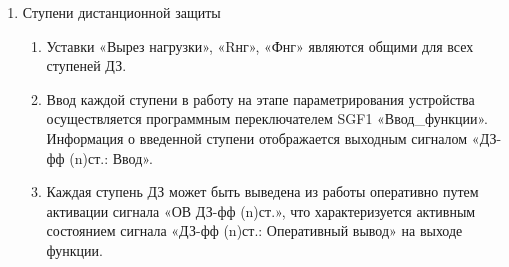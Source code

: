 \begin{enumerate}
\begin{enumerate}
\item
Пусковые  условия  функции  сформируются  только  в  том  случае,  если  отсутствуют  какие-либо блокировки. При  активации  сигнала  пуска,  реле  сопротивления  при  котором  остается  в  сработанном состоянии, запускается таймер Т1 выдержки времени на срабатывание ступени ДЗ. По истечении времени таймера Т1, и отсутствии сигнала блокировки формируется срабатывание ступени ДЗ.

\item
Каждая  ступень  ДЗ  имеет  возможность  оперативного  ускорения.  Оперативное  ускорение  может вводиться:
\begin{itemize} 
    \item при выводе основной защиты оборудования; 
    \item при опробовании оборудования рабочим напряжением; 
    \item при операциях с разъединителями на противоположном конце ВЛ.
\end{itemize}
\item
Для каждой ступени ДЗ предусмотрена возможность ввода автоматического  ускорения при включении выключателя. Функция контроля отсутствия напряжения позволяет ускорять защиту ДЗ при опробовании высоковольтного оборудования. Контроль отсутствия напряжения осуществляется защитой минимального напряжения, цепи которой подключены к ТН, установленному на линии.
\item
Параметры для настройки ДЗ приведены в таблице \ref{dz:tbl0}.

\end{enumerate}

\item\label{sec:sec2} Ступени дистанционной защиты
\begin{enumerate}

\item
Уставки  «Вырез  нагрузки»,  «Rнг»,  «Фнг»  являются  общими  для  всех  ступеней ДЗ.

\item
Ввод каждой ступени в работу на этапе параметрирования устройства осуществляется программным переключателем SGF1 «Ввод\_функции». Информация о введенной ступени отображается выходным сигналом «ДЗ-фф (n)ст.: Ввод».
\item
Каждая ступень ДЗ может быть выведена из работы оперативно путем активации сигнала «ОВ ДЗ-фф (n)ст.», что характеризуется активным состоянием сигнала «ДЗ-фф (n)ст.: Оперативный вывод» на выходе функции.


\end{enumerate}
\end{enumerate}
